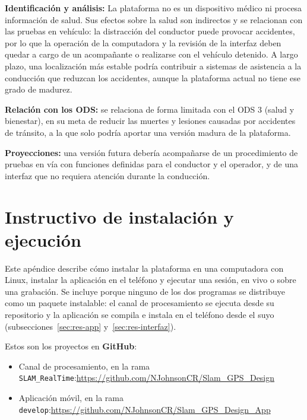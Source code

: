 \textbf{Identificación y análisis:}
La plataforma no es un dispositivo médico ni procesa información de salud.
Sus efectos sobre la salud son indirectos y se relacionan con las pruebas en vehículo: la distracción del conductor puede provocar accidentes, por lo que la operación de la computadora y la revisión de la interfaz deben quedar a cargo de un acompañante o realizarse con el vehículo detenido.
A largo plazo, una localización más estable podría contribuir a sistemas de asistencia a la conducción que reduzcan los accidentes, aunque la plataforma actual no tiene ese grado de madurez.

\textbf{Relación con los ODS:}
se relaciona de forma limitada con el ODS 3 (salud y bienestar), en su meta de reducir las muertes y lesiones causadas por accidentes de tránsito, a la que solo podría aportar una versión madura de la plataforma.

\textbf{Proyecciones:}
una versión futura debería acompañarse de un procedimiento de pruebas en vía con funciones definidas para el conductor y el operador, y de una interfaz que no requiera atención durante la conducción.

\chapter{Instructivo de instalación y ejecución}
\label{appendix:apendiceB}

Este apéndice describe cómo instalar la plataforma en una computadora con Linux, instalar la aplicación en el teléfono y ejecutar una sesión, en vivo o sobre una grabación.
Se incluye porque ninguno de los dos programas se distribuye como un paquete instalable: el canal de procesamiento se ejecuta desde su repositorio y la aplicación se compila e instala en el teléfono desde el suyo (subsecciones~\ref{sec:res-app} y~\ref{sec:res-interfaz}).

Estos son los proyectos en \textbf{GitHub}:

\begin{itemize}
\item Canal de procesamiento, en la rama \texttt{SLAM\_RealTime}:\newline \url{https://github.com/NJohnsonCR/Slam_GPS_Design}
\item Aplicación móvil, en la rama \texttt{develop}:\newline \url{https://github.com/NJohnsonCR/Slam_GPS_Design_App}
\end{itemize}

